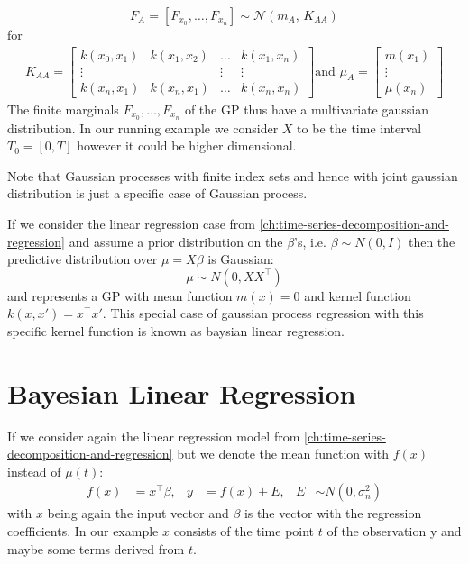 \[F_A = [F_{x_0}, \dots , F_{x_n}] \sim \mathcal{N}(m_A,\,K_{AA})\]
for
\begin{gather*}
    K_{AA} =
    \begin{bmatrix}
        k(x_0, x_1) & k(x_1, x_2) & \dots & k(x_1, x_n)\\
        \vdots  &  & \vdots  & \vdots \\
        k(x_n, x_1)  & k(x_n, x_1) & \dots  & k(x_n, x_n)
    \end{bmatrix} \text{and }
    \mu_A =
    \begin{bmatrix}
        m(x_1) \\
        \vdots \\
        \mu(x_n)
    \end{bmatrix}
\end{gather*}
The finite marginals $F_{x_0}, \dots, F_{x_n}$ of the GP thus have a multivariate gaussian distribution.
In our running example we consider $X$ to be the time interval $T_0=[0, T]$ however it could be higher dimensional.

Note that Gaussian processes with finite index sets and hence with joint gaussian distribution is just a specific case
of Gaussian process.

If we consider the linear regression case from \ref{ch:time-series-decomposition-and-regression} and assume a prior distribution
on the $\beta$'s, i.e. $\beta \sim N(0, I)$ then the predictive distribution over $\mu = X \beta$ is Gaussian:
\[
    \mu \sim N(0, XX^{\top})
\]
and represents a GP with mean function $m(x) = 0$ and kernel function $k(x, x') = x^{\top}x'$.
This special case of gaussian process regression with this specific kernel function is known as baysian linear regression.


\section{Bayesian Linear Regression}

If we consider again the linear regression model from \ref{ch:time-series-decomposition-and-regression} but
we denote the mean function with $f(x)$ instead of $\mu(t)$:
\begin{align*}
    f(x) &= x^{\top}\beta, & y &= f(x) + E, & E &\sim N(0, \sigma_n^2)
\end{align*}
with $x$ being again the input vector and $\beta$ is the vector with the regression coefficients.
In our example $x$ consists of the time point $t$ of the observation y and maybe
some terms derived from $t$.

